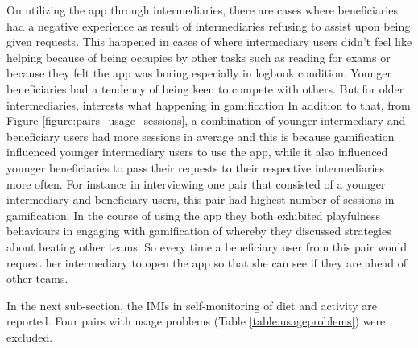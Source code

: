 On utilizing the app through intermediaries, there are cases where beneficiaries had a negative experience as result of intermediaries refusing to assist upon being given requests. This happened in cases of where intermediary users didn't feel like helping because of being occupies by other tasks such as reading for exams or because they felt the app was boring especially in logbook condition. Younger beneficiaries had a tendency of being keen to compete with others. But for older intermediaries, interests what happening in gamification In addition to that, from Figure \ref{figure:pairs_usage_sessions}, a combination of younger intermediary and beneficiary users had more sessions in average and this is because gamification influenced younger intermediary users to use the app, while it also influenced younger beneficiaries to pass their requests to their respective intermediaries more often. For instance in interviewing one pair that consisted of a younger intermediary and beneficiary users, this pair had highest number of sessions in gamification. In the course of using the app they both exhibited playfulness behaviours in engaging with gamification of whereby they discussed strategies about beating other teams. So every time a beneficiary user from this pair would request her intermediary to open the app so that she can see if they are ahead of other teams.

In the next sub-section, the IMIs in self-monitoring of diet and activity are reported. Four pairs with usage problems (Table \ref{table:usageproblems}) were excluded.
